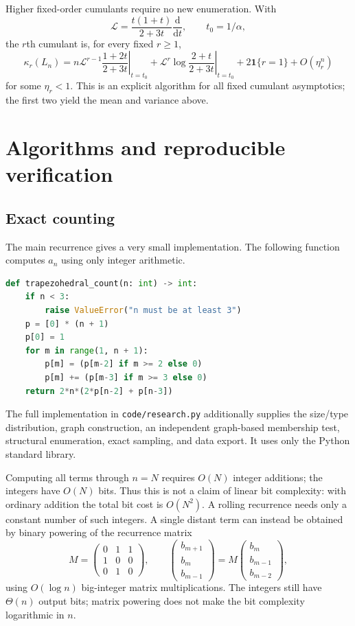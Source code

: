 \documentclass[11pt,letterpaper]{article}
\numberwithin{equation}{section}
\theoremstyle{definition}
\newcommand{\1}{\mathbf 1}
\begin{document}
Higher fixed-order cumulants require no new enumeration. With
\[
 \mathcal L=\frac{t(1+t)}{2+3t}\frac{\mathrm d}{\mathrm dt},
 \qquad t_0=1/\alpha,
\]
the $r$th cumulant is, for every fixed $r\ge1$,
\begin{equation}\label{eq:cumulants}
 \kappa_r(L_n)=
 n\left.\mathcal L^{r-1}\frac{1+2t}{2+3t}\right|_{t=t_0}
 +\left.\mathcal L^r\log\frac{2+t}{2+3t}\right|_{t=t_0}
 +2\1\{r=1\}+O(\eta_r^n)
\end{equation}
for some $\eta_r<1$. This is an explicit algorithm for all fixed cumulant
asymptotics; the first two yield the mean and variance above.

\section{Algorithms and reproducible verification}\label{sec:computation}

\subsection{Exact counting}
The main recurrence gives a very small implementation. The following function
computes $a_n$ using only integer arithmetic.
\begin{lstlisting}[language=Python]
def trapezohedral_count(n: int) -> int:
    if n < 3:
        raise ValueError("n must be at least 3")
    p = [0] * (n + 1)
    p[0] = 1
    for m in range(1, n + 1):
        p[m] = (p[m-2] if m >= 2 else 0)
        p[m] += (p[m-3] if m >= 3 else 0)
    return 2*n*(2*p[n-2] + p[n-3])
\end{lstlisting}
The full implementation in \texttt{code/research.py} additionally supplies
the size/type distribution, graph construction, an independent graph-based
membership test, structural enumeration, exact sampling, and data export.
It uses only the Python standard library.

Computing all terms through $n=N$ requires $O(N)$ integer additions; the
integers have $O(N)$ bits. Thus this is not a claim of linear bit complexity:
with ordinary addition the total bit cost is $O(N^2)$. A rolling recurrence
needs only a constant number of such integers. A single distant term can
instead be obtained by binary powering of the recurrence matrix
\[
 M=\begin{pmatrix}0&1&1\\1&0&0\\0&1&0\end{pmatrix},\qquad
 \begin{pmatrix}b_{m+1}\\b_m\\b_{m-1}\end{pmatrix}
 =M\begin{pmatrix}b_m\\b_{m-1}\\b_{m-2}\end{pmatrix},
\]
using $O(\log n)$ big-integer matrix multiplications. The integers still have
$\Theta(n)$ output bits; matrix powering does not make the bit complexity
logarithmic in $n$.
\end{document}
